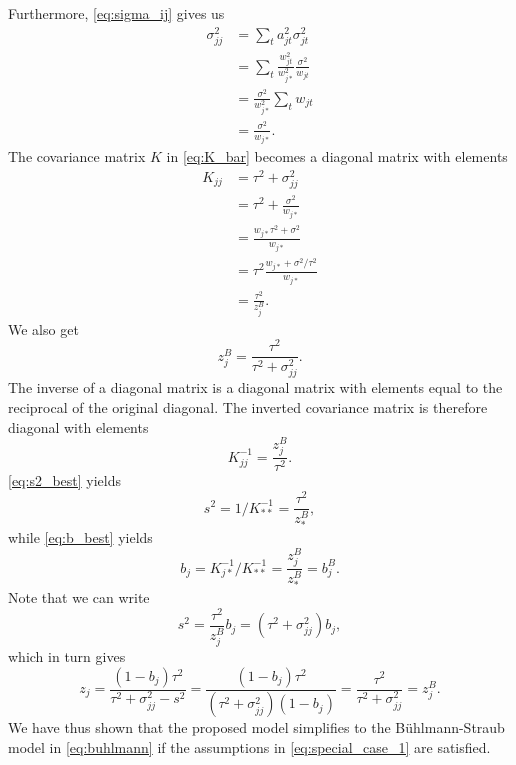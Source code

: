 \documentclass[11pt]{article}
\theoremstyle{definition}
\begin{document}
Furthermore, \eqref{eq:sigma_ij} gives us
\begin{equation}\label{eq:special_case_sigma}
\begin{aligned}
    \sigma_{jj}^2 &= \sum_t a_{jt}^2\sigma_{jt}^2 \\
    &= \sum_t \frac{w_{jt}^2}{w_{j\ast}^2}\frac{\sigma^2}{w_{jt}} \\
    &= \frac{\sigma^2}{w_{j\ast}^2}\sum_t w_{jt} \\
    &= \frac{\sigma^2}{w_{j\ast}}.
\end{aligned}
\end{equation}
The covariance matrix $ K$ in \eqref{eq:K_bar} becomes a diagonal matrix with elements
\begin{equation*}
\begin{aligned}
     K_{jj} &= \tau^2 + \sigma_{jj}^2 \\
    &= \tau^2 + \frac{\sigma^2}{w_{j\ast}} \\
    &= \frac{w_{j\ast}\tau^2 + \sigma^2}{w_{j\ast}} \\
    &= \tau^2\frac{w_{j\ast} + \sigma^2/\tau^2}{w_{j\ast}} \\
    &= \frac{\tau^2}{z_j^B}.
\end{aligned}
\end{equation*}
We also get
\begin{equation*}
    z_j^B = \frac{\tau^2}{\tau^2+\sigma_{jj}^2}.
\end{equation*}
The inverse of a diagonal matrix is a diagonal matrix with elements equal to the reciprocal of the original diagonal. The inverted covariance matrix is therefore diagonal with elements
\begin{equation*}
     K_{jj}^{-1} = \frac{z_j^B}{\tau^2}.
\end{equation*}
\eqref{eq:s2_best} yields
\begin{equation*}
    s^2 = 1/ K_{\ast\ast}^{-1} = \frac{\tau^2}{z_\ast^B},
\end{equation*}
while \eqref{eq:b_best} yields
\begin{equation*}
    b_j =  K_{j\ast}^{-1}/ K_{\ast\ast}^{-1} = \frac{z_j^B}{z_\ast^B} = b_j^B.
\end{equation*}
Note that we can write
\begin{equation*}
    s^2 = \frac{\tau^2}{z_j^B}b_j = (\tau^2 + \sigma_{jj}^2)b_j,
\end{equation*}
which in turn gives
\begin{equation*}
    z_j = \frac{(1-b_j)\tau^2}{\tau^2+\sigma_{jj}^2-s^2} = \frac{(1-b_j)\tau^2}{(\tau^2+\sigma_{jj}^2)(1-b_j)}=\frac{\tau^2}{\tau^2+\sigma_{jj}^2}=z_j^B.
\end{equation*}
We have thus shown that the proposed model simplifies to the Bühlmann-Straub model in \eqref{eq:buhlmann} if the assumptions in \eqref{eq:special_case_1} are satisfied.
\end{document}
